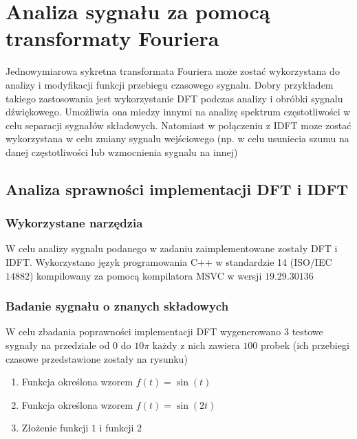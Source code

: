 \documentclass{artikel3}
\begin{document}


\section{Analiza sygnału za pomocą transformaty Fouriera}

Jednowymiarowa sykretna transformata Fouriera może zostać wykorzystana do analizy i modyfikacji funkcji przebiegu czasowego sygnalu.
Dobry przykładem takiego zastosowania jest wykorzystanie DFT podczas analizy i obróbki sygnalu dźwiękowego.
Umożliwia ona miedzy innymi na analizę spektrum częstotliwości w celu separacji sygnałów składowych. Natomiast w połączeniu z IDFT moze zostać wykorzystana w celu zmiany sygnalu wejściowego (np. w celu usuniecia szumu na danej częstotliwości lub wzmocnienia sygnalu na innej)

\subsection{Analiza sprawności implementacji DFT i IDFT }

\subsubsection{Wykorzystane narzędzia}

W celu analizy sygnalu podanego w zadaniu zaimplementowane zostały DFT i IDFT. Wykorzystano język programowania C++ w standardzie 14 (ISO/IEC $14882$) kompilowany za pomocą kompilatora MSVC w wersji $19.29.30136$

\subsubsection{Badanie sygnału o znanych składowych}

W celu zbadania poprawności implementacji DFT wygenerowano 3 testowe sygnały na przedziale od $0$ do $10 \pi$ każdy z nich zawiera $100$ probek (ich przebiegi czasowe przedstawione zostały na rysunku) 

\begin{enumerate}
    \item Funkcja określona wzorem $f(t) = \sin(t)$
    \item Funkcja określona wzorem $f(t) = \sin(2t)$
    \item Złożenie funkcji $1$ i funkcji $2$
\end{enumerate}
\end{document}
